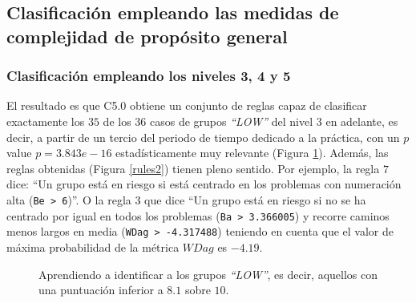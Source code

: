 \subsection{Clasificación empleando las medidas de complejidad de propósito general}

\subsubsection{Clasificación empleando los niveles 3, 4 y 5}

El resultado es que C5.0 obtiene un conjunto de reglas capaz de clasificar exactamente los $35$ de los $36$ casos de grupos \emph{``LOW''} del nivel $3$ en adelante, es decir, a partir de un tercio del periodo de tiempo dedicado a la práctica, con un $p$ value $p = 3.843e-16$ estadísticamente muy relevante (Figura \ref{fig:cm2}). Además, las reglas obtenidas (Figura \ref{rules2}) tienen pleno sentido. Por ejemplo, la regla $7$ dice: ``Un grupo está en riesgo si está centrado en los problemas con numeración alta (\texttt{Be > 6})''. O la regla $3$ que dice ``Un grupo está en riesgo si no se ha centrado por igual en todos los problemas (\texttt{Ba > 3.366005}) y recorre caminos menos largos en media (\texttt{WDag > -4.317488}) teniendo en cuenta que el valor de máxima probabilidad de la métrica $WDag$ es $-4.19$.

\begin{figure}[H]
\centering
{}
\caption{Aprendiendo a identificar a los grupos \emph{``LOW''}, es decir, aquellos con una puntuación inferior a $8.1$ sobre $10$.}
\label{fig:cm2}
\end{figure}

